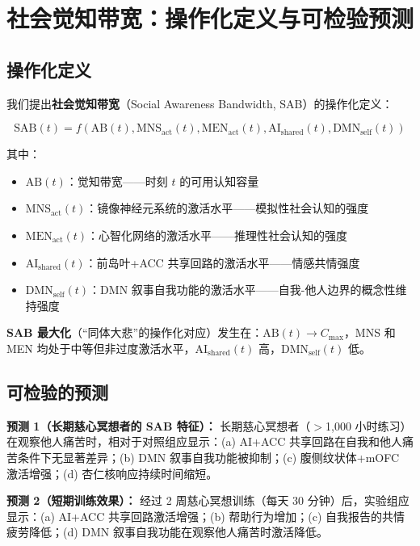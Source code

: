 \documentclass[UTF8,12pt,a4paper]{ctexart}
\begin{document}
\section{社会觉知带宽：操作化定义与可检验预测}

\subsection{操作化定义}

我们提出\textbf{社会觉知带宽}（Social Awareness Bandwidth, SAB）的操作化定义：

\begin{equation}
\text{SAB}(t) = f(\text{AB}(t), \text{MNS}_{\text{act}}(t), \text{MEN}_{\text{act}}(t), \text{AI}_{\text{shared}}(t), \text{DMN}_{\text{self}}(t))
\end{equation}

其中：
\begin{itemize}[nosep]
    \item $\text{AB}(t)$：觉知带宽——时刻 $t$ 的可用认知容量
    \item $\text{MNS}_{\text{act}}(t)$：镜像神经元系统的激活水平——模拟性社会认知的强度
    \item $\text{MEN}_{\text{act}}(t)$：心智化网络的激活水平——推理性社会认知的强度
    \item $\text{AI}_{\text{shared}}(t)$：前岛叶+ACC 共享回路的激活水平——情感共情强度
    \item $\text{DMN}_{\text{self}}(t)$：DMN 叙事自我功能的激活水平——自我-他人边界的概念性维持强度
\end{itemize}

\textbf{SAB 最大化}（``同体大悲''的操作化对应）发生在：$\text{AB}(t) \to C_{\text{max}}$，MNS 和 MEN 均处于中等但非过度激活水平，$\text{AI}_{\text{shared}}(t)$ 高，$\text{DMN}_{\text{self}}(t)$ 低。

\subsection{可检验的预测}

\textbf{预测 1（长期慈心冥想者的 SAB 特征）：} 长期慈心冥想者（$>$1,000 小时练习）在观察他人痛苦时，相对于对照组应显示：(a) AI+ACC 共享回路在自我和他人痛苦条件下无显著差异；(b) DMN 叙事自我功能被抑制；(c) 腹侧纹状体+mOFC 激活增强；(d) 杏仁核响应持续时间缩短。

\textbf{预测 2（短期训练效果）：} 经过 2 周慈心冥想训练（每天 30 分钟）后，实验组应显示：(a) AI+ACC 共享回路激活增强；(b) 帮助行为增加；(c) 自我报告的共情疲劳降低；(d) DMN 叙事自我功能在观察他人痛苦时激活降低。
\end{document}
